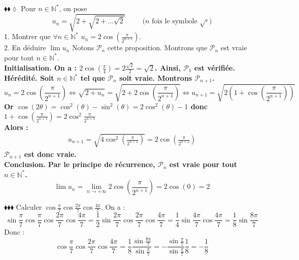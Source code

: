 \documentclass[11pt]{article}
\begin{document}
\begin{exercice}{$\blacklozenge\blacklozenge\lozenge$}{}
    Pour $n\in\mathbb{N}^*$, on pose
    \begin{equation*}
        u_n=\sqrt{2+\sqrt{2+\dots\sqrt{2}}}\hspace{1cm}\text{($n$ fois le symbole $\sqrt{\cdot}$)}
    \end{equation*}
    1. Montrer que $\forall{n\in\mathbb{N}^*}$ $u_n=2\cos(\frac{\pi}{2^{n+1}})$.\\
    2. En déduire $\lim{u_n}$
    \tcblower
     Notons $\mathcal{P}_n$ cette proposition. Montrons que $\mathcal{P}_n$ est vraie pour tout $n\in\mathbb{N}^*$.\\
    \bf{Initialisation.}
    On a : $2\cos(\frac{\pi}{4})=2\frac{\sqrt{2}}{2}=\sqrt{2}$.
    Ainsi, $\mathcal{P}_1$ est vérifiée.\\
    \bf{Hérédité.}
    Soit $n\in\mathbb{N}^*$ tel que $\mathcal{P}_n$ soit vraie. Montrons $\mathcal{P}_{n+1}$.
    \begin{equation*}
        u_n=2\cos\left(\frac{\pi}{2^{n+1}}\right)
        \iff\sqrt{2+u_n}=\sqrt{2+2\cos\left(\frac{\pi}{2^{n+1}}\right)}
        \iff u_{n+1}=\sqrt{2(1+\cos(\frac{\pi}{2^{n+1}}))}
    \end{equation*}
    Or $\cos(2\theta)=\cos^2(\theta)-\sin^2(\theta)=2\cos^2(\theta)-1$ donc $1+\cos(\frac{\pi}{2^{n+1}})=2\cos^2{\frac{\pi}{2^{n+2}}}$\\
    Alors :
    \begin{align*}
        u_{n+1}=\sqrt{4\cos^2(\frac{\pi}{2^{n+2}})}=2\cos(\frac{\pi}{2^{n+2}})
    \end{align*}
    $\mathcal{P}_{n+1}$ est donc vraie.\\
    \bf{Conclusion.} Par le principe de récurrence, $\mathcal{P}_n$ est vraie pour tout $n\in\mathbb{N}^*$.\\[0.25cm]
    \begin{equation*}
        \lim{u_n}=\lim_{n\rightarrow+\infty}{2\cos(\frac{\pi}{2^{n+1}})}=2\cos(0)=2
    \end{equation*}
\end{exercice}

\begin{exercice}{$\blacklozenge\blacklozenge\blacklozenge$}{}
    Calculer $\cos\frac{\pi}{7}\cos\frac{2\pi}{7}\cos\frac{4\pi}{7}$.
    \tcblower
    On a :
    \begin{equation*}
        \sin\frac{\pi}{7}\cos\frac{\pi}{7}\cos\frac{2\pi}{7}\cos\frac{4\pi}{7}=\frac{1}{2}\sin\frac{2\pi}{7}\cos\frac{2\pi}{7}\cos\frac{4\pi}{7}
        =\frac{1}{4}\sin\frac{4\pi}{7}\cos\frac{4\pi}{7}
        =\frac{1}{8}\sin\frac{8\pi}{7}
    \end{equation*}
    Donc :
    \begin{equation*}
        \cos\frac{\pi}{7}\cos\frac{2\pi}{7}\cos\frac{4\pi}{7}=\frac{1}{8}\frac{\sin\frac{8\pi}{7}}{\sin\frac{\pi}{7}}
        =-\frac{\sin\frac{\pi}{7}}{\sin\frac{\pi}{7}}\frac{1}{8}
        =-\frac{1}{8}
    \end{equation*}
\end{exercice}
\end{document}

